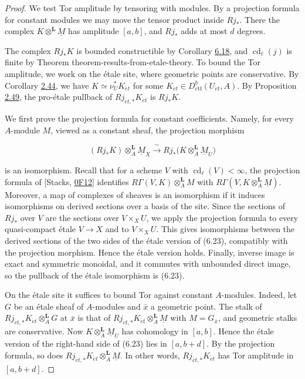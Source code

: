 \documentclass[11pt]{article}
\begin{document}
\begin{proof}[{Proof}]\label{bp571}%
We test Tor amplitude by tensoring with modules. By a projection formula for constant modules we may move the tensor product inside \(Rj_*\). There the complex \(K\otimes^{\mathbf L}\underline M\) has amplitude \([a,b]\), and \(Rj_*\) adds at most \(d\) degrees.

The complex \(Rj_*K\) is bounded constructible by Corollary \hyperref[bp566]{6.18}, and \(\operatorname{cd}_\ell(j)\) is finite by Theorem theorem-results-from-etale-theory. To bound the Tor amplitude, we work on the étale site, where geometric points are conservative. By Corollary \hyperref[bp132]{2.44}, we have \(K\simeq\nu_U^*K_{\acute{e}t}\) for some \(K_{\acute{e}t}\in D^b_{\mathrm{ctf}}(U_{\acute{e}t},A)\). By Proposition \hyperref[bp146]{2.49}, the pro-étale pullback of \(Rj_{\acute{e}t,*}K_{\acute{e}t}\) is \(Rj_*K\).

We first prove the projection formula for constant coefficients. Namely, for every \(A\)-module \(M\), viewed as a constant sheaf, the projection morphism

\[
(Rj_*K)\otimes_A^{\mathbf L}\underline M_X
\xrightarrow{\ \sim\ }
Rj_*\bigl(K\otimes_A^{\mathbf L}\underline M_U\bigr)
\tag{6.23}
\]

is an isomorphism. Recall that for a scheme \(V\) with \(\operatorname{cd}_\ell(V)<\infty\), the projection formula of [Stacks, \href{https://stacks.math.columbia.edu/tag/0F12}{0F12}] identifies \(R\Gamma(V,K)\otimes^{\mathbf L}_AM\) with \(R\Gamma(V,K\otimes^{\mathbf L}_A\underline M)\). Moreover, a map of complexes of sheaves is an isomorphism if it induces isomorphisms on derived sections over a basis of the site. Since the sections of \(Rj_*\) over \(V\) are the sections over \(V\times_XU\), we apply the projection formula to every quasi-compact étale \(V\to X\) and to \(V\times_XU\). This gives isomorphisms between the derived sections of the two sides of the étale version of (6.23), compatibly with the projection morphism. Hence the étale version holds. Finally, inverse image is exact and symmetric monoidal, and it commutes with unbounded direct image, so the pullback of the étale isomorphism is (6.23).

On the étale site it suffices to bound Tor against constant \(A\)-modules. Indeed, let \(G\) be an étale sheaf of \(A\)-modules and \(\bar x\) a geometric point. The stalk of \(Rj_{\acute{e}t,*}K_{\acute{e}t}\otimes^{\mathbf L}_AG\) at \(\bar x\) is that of \(Rj_{\acute{e}t,*}K_{\acute{e}t}\otimes^{\mathbf L}_A\underline M\) with \(M=G_{\bar x}\), and geometric stalks are conservative. Now \(K\otimes_A^{\mathbf L}\underline M_U\) has cohomology in \([a,b]\). Hence the étale version of the right-hand side of (6.23) lies in \([a,b+d]\). By the projection formula, so does \(Rj_{\acute{e}t,*}K_{\acute{e}t}\otimes^{\mathbf L}_A\underline M\). In other words, \(Rj_{\acute{e}t,*}K_{\acute{e}t}\) has Tor amplitude in \([a,b+d]\).


\end{proof}
\end{document}
